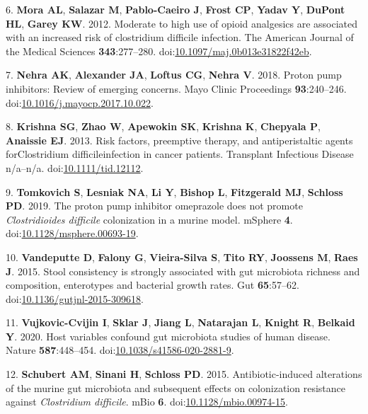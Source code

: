 \documentclass[
  11pt,
]{article}
\begin{document}
\leavevmode\hypertarget{ref-Mora2012}{}%
6. \textbf{Mora AL}, \textbf{Salazar M}, \textbf{Pablo-Caeiro J},
\textbf{Frost CP}, \textbf{Yadav Y}, \textbf{DuPont HL}, \textbf{Garey
KW}. 2012. Moderate to high use of opioid analgesics are associated with
an increased risk of clostridium difficile infection. The American
Journal of the Medical Sciences \textbf{343}:277--280.
doi:\href{https://doi.org/10.1097/maj.0b013e31822f42eb}{10.1097/maj.0b013e31822f42eb}.

\leavevmode\hypertarget{ref-Nehra2018}{}%
7. \textbf{Nehra AK}, \textbf{Alexander JA}, \textbf{Loftus CG},
\textbf{Nehra V}. 2018. Proton pump inhibitors: Review of emerging
concerns. Mayo Clinic Proceedings \textbf{93}:240--246.
doi:\href{https://doi.org/10.1016/j.mayocp.2017.10.022}{10.1016/j.mayocp.2017.10.022}.

\leavevmode\hypertarget{ref-Krishna2013}{}%
8. \textbf{Krishna SG}, \textbf{Zhao W}, \textbf{Apewokin SK},
\textbf{Krishna K}, \textbf{Chepyala P}, \textbf{Anaissie EJ}. 2013.
Risk factors, preemptive therapy, and antiperistaltic agents
forClostridium difficileinfection in cancer patients. Transplant
Infectious Disease n/a--n/a.
doi:\href{https://doi.org/10.1111/tid.12112}{10.1111/tid.12112}.

\leavevmode\hypertarget{ref-Tomkovich2019}{}%
9. \textbf{Tomkovich S}, \textbf{Lesniak NA}, \textbf{Li Y},
\textbf{Bishop L}, \textbf{Fitzgerald MJ}, \textbf{Schloss PD}. 2019.
The proton pump inhibitor omeprazole does not promote
\emph{Clostridioides difficile} colonization in a murine model. mSphere
\textbf{4}.
doi:\href{https://doi.org/10.1128/msphere.00693-19}{10.1128/msphere.00693-19}.

\leavevmode\hypertarget{ref-Vandeputte2015}{}%
10. \textbf{Vandeputte D}, \textbf{Falony G}, \textbf{Vieira-Silva S},
\textbf{Tito RY}, \textbf{Joossens M}, \textbf{Raes J}. 2015. Stool
consistency is strongly associated with gut microbiota richness and
composition, enterotypes and bacterial growth rates. Gut
\textbf{65}:57--62.
doi:\href{https://doi.org/10.1136/gutjnl-2015-309618}{10.1136/gutjnl-2015-309618}.

\leavevmode\hypertarget{ref-VujkovicCvijin2020}{}%
11. \textbf{Vujkovic-Cvijin I}, \textbf{Sklar J}, \textbf{Jiang L},
\textbf{Natarajan L}, \textbf{Knight R}, \textbf{Belkaid Y}. 2020. Host
variables confound gut microbiota studies of human disease. Nature
\textbf{587}:448--454.
doi:\href{https://doi.org/10.1038/s41586-020-2881-9}{10.1038/s41586-020-2881-9}.

\leavevmode\hypertarget{ref-Schubert2015}{}%
12. \textbf{Schubert AM}, \textbf{Sinani H}, \textbf{Schloss PD}. 2015.
Antibiotic-induced alterations of the murine gut microbiota and
subsequent effects on colonization resistance against \emph{Clostridium
difficile}. mBio \textbf{6}.
doi:\href{https://doi.org/10.1128/mbio.00974-15}{10.1128/mbio.00974-15}.
\end{document}
